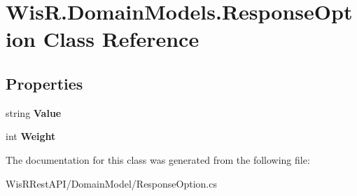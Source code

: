 \hypertarget{class_wis_r_1_1_domain_models_1_1_response_option}{}\section{Wis\+R.\+Domain\+Models.\+Response\+Option Class Reference}
\label{class_wis_r_1_1_domain_models_1_1_response_option}
\subsection*{Properties}
\begin{DoxyCompactItemize}
\item 
\hypertarget{class_wis_r_1_1_domain_models_1_1_response_option_a57a58d8db863e45cee55bb1420cec316}{}string {\bfseries Value}\label{class_wis_r_1_1_domain_models_1_1_response_option_a57a58d8db863e45cee55bb1420cec316}

\item 
\hypertarget{class_wis_r_1_1_domain_models_1_1_response_option_a25c33efaae260638d9b717c908f7b599}{}int {\bfseries Weight}\label{class_wis_r_1_1_domain_models_1_1_response_option_a25c33efaae260638d9b717c908f7b599}

\end{DoxyCompactItemize}


The documentation for this class was generated from the following file\+:\begin{DoxyCompactItemize}
\item 
Wis\+R\+Rest\+A\+P\+I/\+Domain\+Model/Response\+Option.\+cs\end{DoxyCompactItemize}

